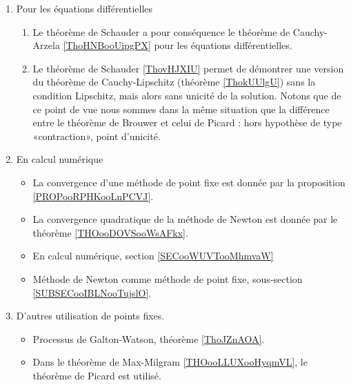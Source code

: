 \begin{enumerate}
\item Pour les équations différentielles
    \begin{enumerate}
        \item 
            Le théorème de Schauder a pour conséquence le théorème de Cauchy-Arzela \ref{ThoHNBooUipgPX} pour les équations différentielles.
        \item
            Le théorème de Schauder \ref{ThovHJXIU} permet de démontrer une version du théorème de Cauchy-Lipschitz (théorème \ref{ThokUUlgU}) sans la condition Lipschitz, mais alors sans unicité de la solution. Notons que de ce point de vue nous sommes dans la même situation que la différence entre le théorème de Brouwer et celui de Picard : hors hypothèse de type «contraction», point d'unicité.
    \end{enumerate}
\item
    En calcul numérique
    \begin{itemize}
        \item
            La convergence d'une méthode de point fixe est donnée par la proposition \ref{PROPooRPHKooLnPCVJ}.
        \item
            La convergence quadratique de la méthode de Newton est donnée par le théorème \ref{THOooDOVSooWsAFkx}.
        \item
            En calcul numérique, section \ref{SECooWUVTooMhmvaW}
        \item
            Méthode de Newton comme méthode de point fixe, sous-section \ref{SUBSECooIBLNooTujslO}.
    \end{itemize}

\item
    D'autres utilisation de points fixes.
\begin{itemize}
    \item
        Processus de Galton-Watson, théorème \ref{ThoJZnAOA}.
    \item 
        Dans le théorème de Max-Milgram \ref{THOooLLUXooHyqmVL}, le théorème de Picard est utilisé.
\end{itemize}


\end{enumerate}

